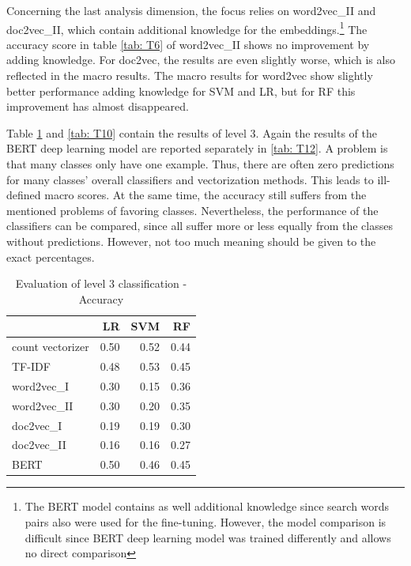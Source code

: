 \documentclass[12pt, a4paper, titlepage]{article}
\begin{document}
Concerning the last analysis dimension, the focus relies on word2vec\_II and doc2vec\_II, which contain additional knowledge for the embeddings.\footnote{The \ac{BERT} model contains as well additional knowledge since search words pairs also were used for the fine-tuning. However, the model comparison is difficult since \ac{BERT} deep learning model was trained differently and allows no direct comparison} The accuracy score in table \ref{tab: T6}  of word2vec\_II shows no improvement by adding knowledge. For doc2vec, the results are even slightly worse, which is also reflected in the macro results. The macro results for word2vec show slightly better performance adding knowledge for \ac{SVM} and \ac{LR}, but for \ac{RF} this improvement has almost disappeared.

Table \ref{tab: T8} and \ref{tab: T10} contain the results of level 3. Again the results of the \ac{BERT} deep learning model are reported separately in \ref{tab: T12}. A problem is that many classes only have one example. Thus, there are often zero predictions for many classes' overall classifiers and vectorization methods. This leads to ill-defined macro scores. At the same time, the accuracy still suffers from the mentioned problems of favoring classes. Nevertheless, the performance of the classifiers can be compared, since all suffer more or less equally from the classes without predictions. However, not too much meaning should be given to the exact percentages.

\begin{table}[hb!]
  \center
\begin{tabular}{lrrr}
\hline
{} &   \textbf{LR} &   \textbf{SVM} &    \textbf{RF} \\
\hline
count vectorizer &  0.50 &  0.52 &  0.44 \\
TF-IDF           &  0.48 &  0.53 &  0.45 \\
word2vec\_I      &  0.30 &  0.15 &  0.36 \\
word2vec\_II     &  0.30 &  0.20 &  0.35 \\
doc2vec\_I       &  0.19 &  0.19 &  0.30 \\
doc2vec\_II      &  0.16 &  0.16 &  0.27 \\
BERT            &  0.50 &  0.46 &  0.45 \\
\hline
\end{tabular}
\caption{\label{tab: T8} Evaluation of level 3 classification - Accuracy}
\end{table}
\end{document}
